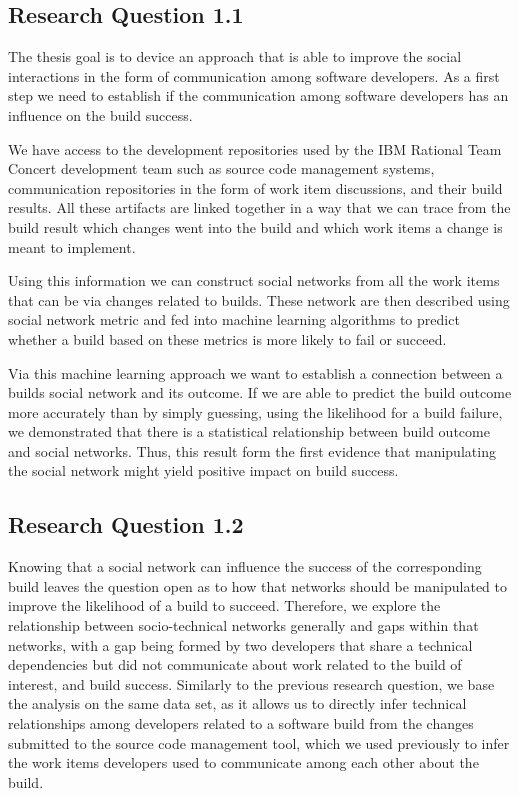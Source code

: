 \subsection{Research Question 1.1}
The thesis goal is to device an approach that is able to improve the social interactions in the form of communication among software developers.
As a first step we need to establish if the communication among software developers has an influence on the build success.

We have access to the development repositories used by the IBM Rational Team Concert development team such as source code management systems, communication repositories in the form of work item discussions, and their build results.
All these artifacts are linked together in a way that we can trace from the build result which changes went into the build and which work items a change is meant to implement.

Using this information we can construct social networks from all the work items that can be via changes related to builds.
These network are then described using social network metric and fed into machine learning algorithms to predict whether a build based on these metrics is more likely to fail or succeed.

Via this machine learning approach we want to establish a connection between a builds social network and its outcome. 
If we are able to predict the build outcome more accurately than by simply guessing, using the likelihood for a build failure, we demonstrated that there is a statistical relationship between build outcome and social networks.
Thus, this result form the first evidence that manipulating the social network might yield positive impact on build success.

\subsection{Research Question 1.2}
Knowing that a social network can influence the success of the corresponding build leaves the question open as to how that networks should be manipulated to improve the likelihood of a build to succeed.
Therefore, we explore the relationship between socio-technical networks generally and gaps within that networks, with a gap being formed by two developers that share a technical dependencies but did not communicate about work related to the build of interest, and build success.
Similarly to the previous research question, we base the analysis on the same data set, as it allows us to directly infer technical relationships among developers related to a software build from the changes submitted to the source code management tool, which we used previously to infer the work items developers used to communicate among each other about the build.

